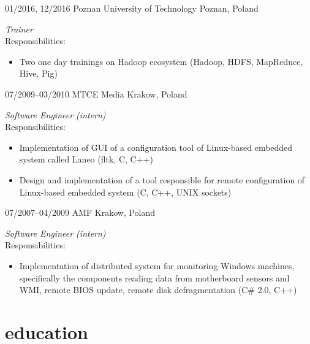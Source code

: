 \documentclass[]{gaza-cv} %
\begin{document}
\begin{entrylist}

\entry
{01/2016, 12/2016}
{Poznan University of Technology}
{Poznan, Poland}
{\emph{Trainer}\\
Responsibilities:
\begin{itemize}
\item Two one day trainings on Hadoop ecosystem (Hadoop, HDFS, MapReduce, Hive, Pig)
\end{itemize}}


\entry
{07/2009--03/2010}
{MTCE Media}
{Krakow, Poland}
{\emph{ Software Engineer (intern)} \\
Responsibilities:
\begin{itemize}
\item Implementation of GUI of a configuration tool of Linux-based embedded system called Laneo (fltk, C, C++)
\item Design and implementation of a tool responsible for remote configuration of Linux-based embedded system (C, C++, UNIX sockets)
\end{itemize}}


\entry
{07/2007--04/2009}
{AMF}
{Krakow, Poland}
{\emph{Software Engineer (intern)} \\
Responsibilities:
\begin{itemize}
\item Implementation of distributed system for monitoring Windows machines, specifically the components reading data from motherboard sensors and WMI, remote BIOS update, remote disk defragmentation (C\# 2.0, C++)
\end{itemize}}

\end{entrylist}


\section{education}
\end{document}
